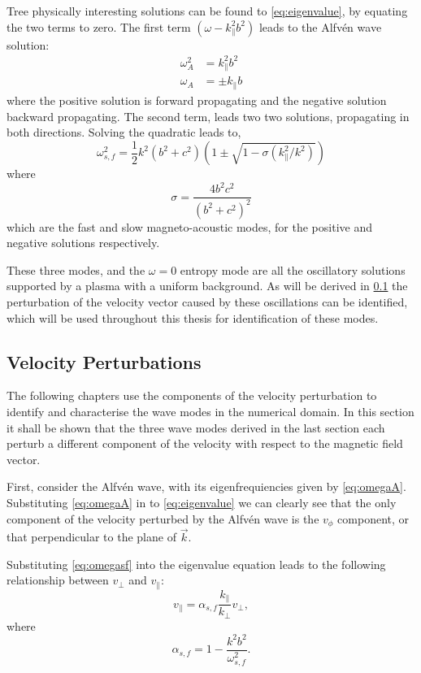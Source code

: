 Tree physically interesting solutions can be found to \cref{eq:eigenvalue}, by equating the two terms to zero.
The first term $(\omega - k_\parallel^2 b^2)$ leads to the Alfv\'en wave solution:
\begin{align}
\omega^2_A &= k^2_\parallel b^2\\
\omega_A &= \pm k_\parallel b
\label{eq:omegaA}
\end{align}
where the positive solution is forward propagating and the negative solution backward propagating.
The second term, leads two two solutions, propagating in both directions. Solving the quadratic leads to,
\begin{equation}
    \omega^2_{s,f} = \frac{1}{2}k^2(b^2+c^2)\left(1 \pm \sqrt{1 - \sigma (k^2_\parallel/k^2)}\right)
    \label{eq:omegasf}
\end{equation}
where
\begin{equation}
    \sigma=\frac{4b^2c^2}{(b^2 + c^2)^2}
    \label{eq:sigmasf}
\end{equation}
which are the fast and slow magneto-acoustic modes, for the positive and negative solutions respectively.

These three modes, and the $\omega = 0$ entropy mode are all the oscillatory solutions supported by a plasma with a uniform background.
As will be derived in \cref{sec:Vpert} the perturbation of the velocity vector caused by these oscillations can be identified, which will be used throughout this thesis for identification of these modes.


\subsection{Velocity Perturbations}\label{sec:Vpert}

The following chapters use the components of the velocity perturbation to identify and characterise the wave modes in the numerical domain.
In this section it shall be shown that the three wave modes derived in the last section each perturb a different component of the velocity with respect to the magnetic field vector.

First, consider the Alfv\'en wave, with its eigenfrequiencies given by \cref{eq:omegaA}.
Substituting \cref{eq:omegaA} in to \cref{eq:eigenvalue} we can clearly see that the only component of the velocity perturbed by the Alfv\'en wave is the $v_\phi$ component, or that perpendicular to the plane of $\vec{k}$.

Substituting \cref{eq:omegasf} into the eigenvalue equation leads to the following relationship between $v_\perp$ and $v_\parallel$:
\begin{equation}
    v_\parallel = \alpha_{s,f} \frac{k_\parallel}{k_\perp}v_\perp,
    \label{eq:vyvz}
\end{equation}
where
\begin{equation}
    \alpha_{s,f} = 1 - \frac{k^2b^2}{\omega^2_{s,f}}.
    \label{eq:alphasf}
\end{equation}

